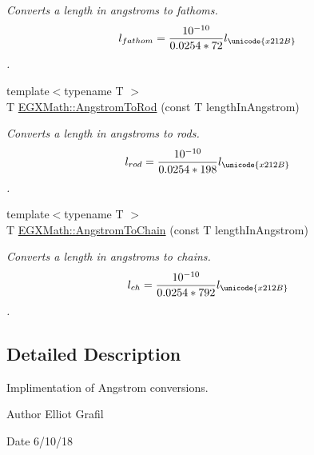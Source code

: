 \begin{DoxyCompactItemize}
\begin{DoxyCompactList}\small\item\em Converts a length in angstroms to fathoms. \[ l_{fathom}= \frac{10^{-10}}{0.0254 * 72} l_{\unicode{x212B}} \]. \end{DoxyCompactList}\item 
{\footnotesize template$<$typename T $>$ }\\T \mbox{\hyperlink{group___e_g_x_math-_conversions-_length_conversions-_non-_s_i-_angstrom-_surveyors_gaf6080801cd8901dc21f80eed4ec3e421}{E\+G\+X\+Math\+::\+Angstrom\+To\+Rod}} (const T length\+In\+Angstrom)
\begin{DoxyCompactList}\small\item\em Converts a length in angstroms to rods. \[ l_{rod}= \frac{10^{-10}}{0.0254 * 198} l_{\unicode{x212B}} \]. \end{DoxyCompactList}\item 
{\footnotesize template$<$typename T $>$ }\\T \mbox{\hyperlink{group___e_g_x_math-_conversions-_length_conversions-_non-_s_i-_angstrom-_surveyors_ga76c09fcaebaf5049097b7d555c3f2f49}{E\+G\+X\+Math\+::\+Angstrom\+To\+Chain}} (const T length\+In\+Angstrom)
\begin{DoxyCompactList}\small\item\em Converts a length in angstroms to chains. \[ l_{ch}= \frac{10^{-10}}{0.0254 * 792} l_{\unicode{x212B}} \]. \end{DoxyCompactList}\end{DoxyCompactItemize}


\subsection{Detailed Description}
Implimentation of Angstrom conversions. 

\begin{DoxyAuthor}{Author}
Elliot Grafil 
\end{DoxyAuthor}
\begin{DoxyDate}{Date}
6/10/18 
\end{DoxyDate}
